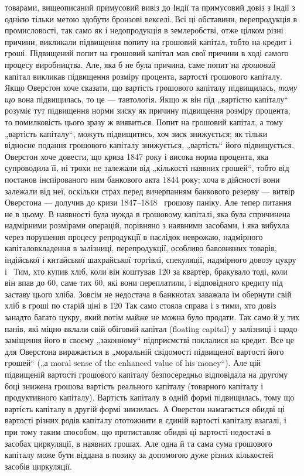 \parcont{}  %
товарами, вищеописаний примусовий вивіз до Індії та примусовий
довіз з Індії з однією тільки метою здобути бронзові векселі.
Всі ці обставини, перепродукція в промисловості, так само як
і недопродукція в землеробстві, отже цілком різні причини, викликали підвищення попиту на грошовий
капітал, тобто на кредит і гроші. Підвищений попит на грошовий капітал мав свої
причини в ході самого процесу виробництва. Але, яка б не була
причина, саме попит на \emph{грошовий} капітал викликав підвищення
розміру процента, вартості грошового капіталу. Якщо Оверстон хоче сказати, що вартість грошового
капіталу підвищилась, \emph{тому що} вона підвищилась, то це — тавтологія. Якщо ж
він під „вартістю капіталу“ розуміє тут підвищення норми зиску
як причину підвищення розміру процента, то помилковість цього
зразу ж виявиться. Попит на грошовий капітал, а тому „вартість капіталу“, можуть підвищитись, хоч
зиск знижується; як
тільки відносне подання грошового капіталу знижується, „вартість“ його підвищується. Оверстон хоче
довести, що криза 1847 року і висока норма процента, яка супроводила її, ні трохи
не залежали від „кількості наявних грошей“, тобто від постанов інспірованого ним банкового акта 1844
року; хоча в дійсності вони залежали від неї, оскільки страх перед вичерпанням
банкового резерву — витвір Оверстона — долучив до кризи 1847--1848~ грошову паніку. Але тепер
питання не в цьому.
В наявності була нужда в грошовому капіталі, яка була спричинена надмірними розмірами операцій,
порівняно з наявними засобами, і яка вибухла через порушення процесу репродукції в наслідок
неврожаю, надмірного капіталовкладення в залізниці, перепродукції, особливо бавовняних товарів,
індійської і китайської
шахрайської торгівлі, спекуляції, надмірного довозу цукру і~
Тим, хто купив хліб, коли він коштував 120 за квартер, бракувало тоді, коли він впав до 60, саме тих
60, які вони переплатили, і відповідного кредиту під
заставу цього хліба. Зовсім не недостача в банкнотах заважала
їм обернути свій хліб в гроші по старій ціні в 120
Так само стояла справа і з тими, хто довіз занадто багато
цукру, який потім майже не можна було продати. Так само й
у тих панів, які міцно вклали свій обіговий капітал (floating capital)
у залізниці і щодо заміщення його в своєму „законному“ підприємстві поклалися на кредит. Все це для
Оверстона виражається в „моральній свідомості підвищеної вартості його грошей“ („а moral sense of
the enhanced value of his money“). Але цій
підвищеній вартості грошового капіталу безпосередньо відповідала на другому боці знижена грошова
вартість реального капіталу
(товарного капіталу і продуктивного капіталу). Вартість капіталу
в одній формі підвищилась, тому що вартість капіталу в другій
формі знизилась. А Оверстон намагається обидві ці вартості різних
родів капіталу ототожнити в єдиній вартості капіталу взагалі, і
при тому таким способом, що протиставляє обидві ці вартості недостачі
в засобах циркуляції, в наявних грошах. Але одна й та сама
сума грошового капіталу може бути віддана в позику за допомогою дуже різних кількостей засобів
циркуляції.

